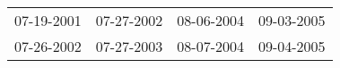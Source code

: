 \begin{supertabular}{llll}
 07-19-2001 &  07-27-2002 &  08-06-2004 &  09-03-2005 \\
 07-26-2002 &  07-27-2003 &  08-07-2004 &  09-04-2005 \\
\end{supertabular}
